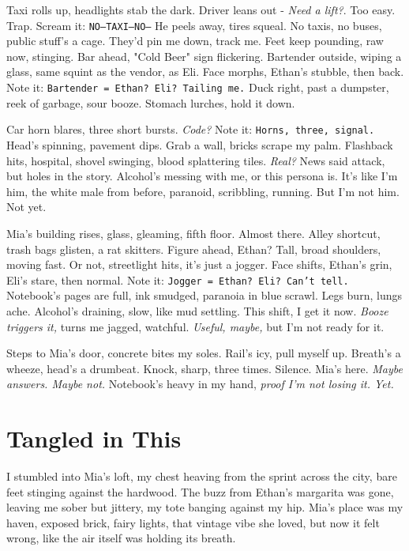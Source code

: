\documentclass[12pt,oneside]{book}
\newcommand{\note}[1]{\texttt{#1}}
\begin{document}
Taxi rolls up, headlights stab the dark. Driver leans out - \textit{Need a lift?}. Too easy. Trap. Scream it: \note{NO—TAXI—NO—} He peels away, tires squeal. No taxis, no buses, public stuff’s a cage. They’d pin me down, track me. Feet keep pounding, raw now, stinging. Bar ahead, "Cold Beer" sign flickering. Bartender outside, wiping a glass, same squint as the vendor, as \textnormal{Eli}. Face morphs, Ethan’s stubble, then back. Note it: \note{Bartender = Ethan? Eli? Tailing me.} Duck right, past a dumpster, reek of garbage, sour booze. Stomach lurches, hold it down.

Car horn blares, three short bursts. \textit{Code?} Note it: \note{Horns, three, signal.} Head’s spinning, pavement dips. Grab a wall, bricks scrape my palm. Flashback hits, hospital, shovel swinging, blood splattering tiles. \textit{Real?} News said attack, but holes in the story. Alcohol’s messing with me, or this persona is. It’s like I’m him, the white male from before, paranoid, scribbling, running. But I’m not him. Not yet.

Mia’s building rises, glass, gleaming, fifth floor. Almost there. Alley shortcut, trash bags glisten, a rat skitters. Figure ahead, Ethan? Tall, broad shoulders, moving fast. Or not, streetlight hits, it’s just a jogger. Face shifts, Ethan’s grin, \textnormal{Eli}’s stare, then normal. Note it: \note{Jogger = Ethan? Eli? Can’t tell.} Notebook’s pages are full, ink smudged, paranoia in blue scrawl. Legs burn, lungs ache. Alcohol’s draining, slow, like mud settling. This shift, I get it now. \textit{Booze triggers it,} turns me jagged, watchful. \textit{Useful, maybe,} but I’m not ready for it.

Steps to Mia’s door, concrete bites my soles. Rail’s icy, pull myself up. Breath’s a wheeze, head’s a drumbeat. Knock, sharp, three times. Silence. Mia’s here. \textit{Maybe answers. Maybe not.} Notebook’s heavy in my hand, \textit{proof I’m not losing it. Yet.}

\chapter{Tangled in This}

I stumbled into Mia’s loft, my chest heaving from the sprint across the city, bare feet stinging against the hardwood. The buzz from Ethan’s margarita was gone, leaving me sober but jittery, my tote banging against my hip. Mia’s place was my haven, exposed brick, fairy lights, that vintage vibe she loved, but now it felt wrong, like the air itself was holding its breath.
\end{document}
